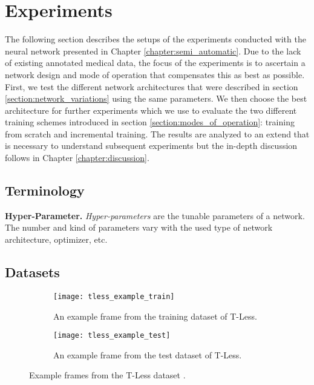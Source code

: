 \chapter{Experiments} \label{chapter:experiments}

The following section describes the setups of the experiments conducted with the neural network presented in Chapter \ref{chapter:semi_automatic}. Due to the lack of existing annotated medical data, the focus of the experiments is to ascertain a network design and mode of operation that compensates this as best as possible. First, we test the different network architectures that were described in section \ref{section:network_variations} using the same parameters. We then choose the best architecture for further experiments which we use to evaluate the two different training schemes introduced in section \ref{section:modes_of_operation}: training from scratch and incremental training. The results are analyzed to an extend that is necessary to understand subsequent experiments but the in-depth discussion follows in Chapter \ref{chapter:discussion}.

\section{Terminology}

\noindent\textbf{Hyper-Parameter.} \textit{Hyper-parameters} are the tunable parameters of a network. The number and kind of parameters vary with the used type of network architecture, optimizer, etc.

\section{Datasets} \label{section:experiments_datasets}

\begin{figure}[!tbp]
	\centering
	\begin{subfigure}[t]{0.47\textwidth}
		\centering
    	\texttt{[image: tless\_example\_train]}
    	\caption{An example frame from the training dataset of T-Less.}
    	\label{fig:tless_example_train}
	\end{subfigure}
	\hfill
	\begin{subfigure}[t]{0.47\textwidth}
		\centering
    	\texttt{[image: tless\_example\_test]}
    	\caption{An example frame from the test dataset of T-Less.}
    	\label{fig:tless_example_test}
	\end{subfigure}
	\caption{Example frames from the T-Less dataset \cite{tless}.}
	\label{fig:tless_examples}
\end{figure}

